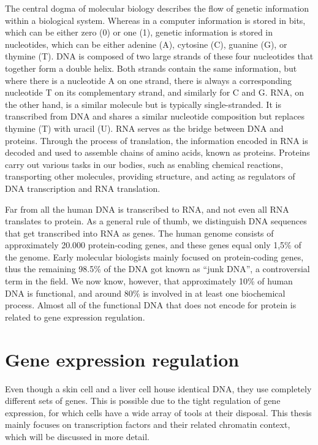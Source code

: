 The central dogma of molecular biology describes the flow of genetic information within a biological system. Whereas in a computer information is stored in bits, which can be either zero (0) or one (1), genetic information is stored in nucleotides, which can be either adenine (A), cytosine (C), guanine (G), or thymine (T). DNA is composed of two large strands of these four nucleotides that together form a double helix. Both strands contain the same information, but where there is a nucleotide A on one strand, there is always a corresponding nucleotide T on its complementary strand, and similarly for C and G. RNA, on the other hand, is a similar molecule but is typically single-stranded. It is transcribed from DNA and shares a similar nucleotide composition but replaces thymine (T) with uracil (U). RNA serves as the bridge between DNA and proteins. Through the process of translation, the information encoded in RNA is decoded and used to assemble chains of amino acids, known as proteins. Proteins carry out various tasks in our bodies, such as enabling chemical reactions, transporting other molecules, providing structure, and acting as regulators of DNA transcription and RNA translation.

Far from all the human DNA is transcribed to RNA, and not even all RNA translates to protein. As a general rule of thumb, we distinguish DNA sequences that get transcribed into RNA as genes. The human genome consists of approximately 20.000 protein-coding genes, and these genes equal only 1,5\% of the genome\cite{Piovesan2019}. Early molecular biologists mainly focused on protein-coding genes, thus the remaining 98.5\% of the DNA got known as ``junk DNA'', a controversial term in the field\cite{Graur2013}. We now know, however, that approximately 10\% of human DNA is functional\cite{Graur2013}, and around 80\% is involved in at least one biochemical process\cite{encode2012}. Almost all of the functional DNA that does not encode for protein is related to gene expression regulation.

\section{Gene expression regulation}

Even though a skin cell and a liver cell house identical DNA, they use completely different sets of genes. This is possible due to the tight regulation of gene expression, for which cells have a wide array of tools at their disposal. This thesis mainly focuses on transcription factors and their related chromatin context, which will be discussed in more detail.

